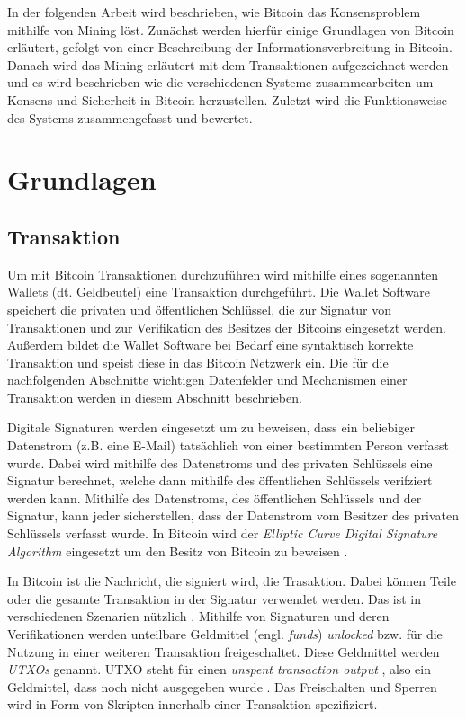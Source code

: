 \documentclass[ngerman,runningheads,a4paper]{llncs}[2018/03/10]
\begin{document}
In der folgenden Arbeit wird beschrieben, wie Bitcoin das Konsensproblem mithilfe von Mining löst. Zunächst werden hierfür einige Grundlagen von Bitcoin erläutert, gefolgt von einer Beschreibung der Informationsverbreitung in Bitcoin. Danach wird das Mining erläutert mit dem Transaktionen aufgezeichnet werden und es wird beschrieben wie die verschiedenen Systeme zusammearbeiten um Konsens und Sicherheit in Bitcoin herzustellen. Zuletzt wird die Funktionsweise des Systems zusammengefasst und bewertet.

\section{Grundlagen}\label{sec:grundlagen}

\subsection{Transaktion}\label{sec:transaktionen}

Um mit Bitcoin Transaktionen durchzuführen wird mithilfe eines sogenannten Wallets (dt. Geldbeutel) eine Transaktion durchgeführt. Die Wallet Software speichert die privaten und öffentlichen Schlüssel, die zur Signatur von Transaktionen und zur Verifikation des Besitzes der Bitcoins eingesetzt werden. Außerdem bildet die Wallet Software bei Bedarf eine syntaktisch korrekte Transaktion und speist diese in das Bitcoin Netzwerk ein. Die für die nachfolgenden Abschnitte wichtigen Datenfelder und Mechanismen einer Transaktion werden in diesem Abschnitt beschrieben.

Digitale Signaturen werden eingesetzt um zu beweisen, dass ein beliebiger Datenstrom (z.B. eine E-Mail) tatsächlich von einer bestimmten Person verfasst wurde. Dabei wird mithilfe des Datenstroms und des privaten Schlüssels eine Signatur berechnet, welche dann mithilfe des öffentlichen Schlüssels verifziert werden kann. Mithilfe des Datenstroms, des öffentlichen Schlüssels und der Signatur, kann jeder sicherstellen, dass der Datenstrom vom Besitzer des privaten Schlüssels verfasst wurde. In Bitcoin wird der \textit{Elliptic Curve Digital Signature Algorithm} eingesetzt um den Besitz von Bitcoin zu beweisen \citep{bitcoinbook}.

In Bitcoin ist die Nachricht, die signiert wird, die Trasaktion. Dabei können Teile oder die gesamte Transaktion in der Signatur verwendet werden. Das ist in verschiedenen Szenarien nützlich \citep{bitcoinbook}. Mithilfe von Signaturen und deren Verifikationen werden unteilbare Geldmittel (engl. \textit{funds}) \textit{unlocked} bzw. für die Nutzung in einer weiteren Transaktion freigeschaltet. Diese Geldmittel werden \textit{UTXOs} genannt. UTXO steht für einen \textit{unspent transaction output} \citep{bitcoinbook}, also ein Geldmittel, dass noch nicht ausgegeben wurde . Das Freischalten und Sperren wird in Form von Skripten innerhalb einer Transaktion spezifiziert. 
\end{document}
